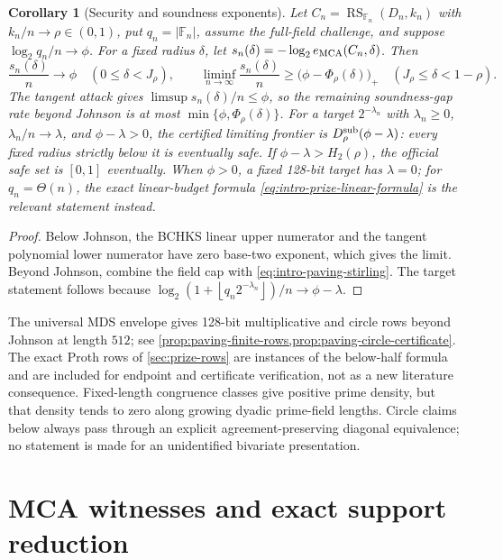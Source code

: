 \documentclass[11pt,a4paper]{amsart}
\numberwithin{equation}{section}
\newtheorem{corollary}[corollary]{Corollary}
\theoremstyle{remark}
\DeclareMathOperator{\RS}{RS}
\newcommand{\F}{\mathbb F}
\newcommand{\abs}[1]{\lvert #1\rvert}
\newcommand{\floor}[1]{\left\lfloor #1\right\rfloor}
\begin{document}
\begin{corollary}[Security and soundness exponents]
\label{cor:intro-security-exponents}
Let \(C_n=\RS_{\F_n}(D_n,k_n)\) with \(k_n/n\to\rho\in(0,1)\), put
\(q_n=\abs{\F_n}\), assume the full-field challenge, and suppose
\(\log_2 q_n/n\to\phi\).  For a fixed radius \(\delta\), let
\(s_n(\delta)=-\log_2 e_{\rm MCA}(C_n,\delta)\).  Then
\[
 \frac{s_n(\delta)}n\longrightarrow\phi
 \quad(0\le\delta<J_\rho),\qquad
 \liminf_{n\to\infty}\frac{s_n(\delta)}n
 \ge\bigl(\phi-\Phi_\rho(\delta)\bigr)_+
 \quad(J_\rho\le\delta<1-\rho).                   \tag{1.15}
 \label{eq:intro-security-exponents}
\]
The tangent attack gives \(\limsup s_n(\delta)/n\le\phi\), so the
remaining soundness-gap rate beyond Johnson is at most
\(\min\{\phi,\Phi_\rho(\delta)\}\).  For a target
\(2^{-\lambda_n}\) with \(\lambda_n\ge0\),
\(\lambda_n/n\to\lambda\), and
\(\phi-\lambda>0\), the certified limiting frontier is
\(D_\rho^{\rm sub}(\phi-\lambda)\): every fixed radius strictly below it is
eventually safe.  If \(\phi-\lambda>H_2(\rho)\), the official safe set is
\([0,1]\) eventually.  When \(\phi>0\), a fixed 128-bit target has
\(\lambda=0\); for \(q_n=\Theta(n)\), the exact linear-budget formula
\eqref{eq:intro-prize-linear-formula} is the relevant statement instead.
\end{corollary}

\begin{proof}
Below Johnson, the BCHKS linear upper numerator and the tangent polynomial
lower numerator have zero base-two exponent, which gives the limit.  Beyond
Johnson, combine the field cap with
\eqref{eq:intro-paving-stirling}.  The target statement follows because
\(\log_2(1+\floor{q_n2^{-\lambda_n}})/n\to\phi-\lambda\).
\end{proof}

The universal MDS envelope gives 128-bit multiplicative and circle rows
beyond Johnson at length \(512\); see
\cref{prop:paving-finite-rows,prop:paving-circle-certificate}.
The exact Proth rows of
\cref{sec:prize-rows} are instances of the below-half formula and are
included for endpoint and certificate verification, not as a new
literature consequence.  Fixed-length congruence classes give positive
prime density, but that density tends to zero along growing dyadic
prime-field lengths.  Circle claims below always pass through an explicit
agreement-preserving diagonal equivalence; no statement is made for an
unidentified bivariate presentation.
\section{MCA witnesses and exact support reduction}\label{sec:witnesses}
\end{document}
